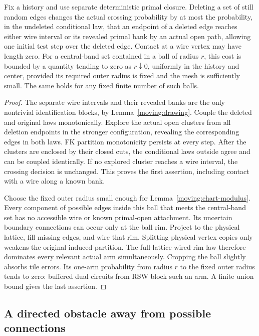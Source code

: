 \begin{lemma}\label{moving:deletion}
Fix a history and use separate deterministic primal closure.
Deleting a set of still random edges changes the actual crossing
probability by at most the probability, in the undeleted conditional
law, that an endpoint of a deleted edge reaches either wire interval
or its revealed primal bank by an actual open path, allowing one
initial test step over the deleted edge.  Contact at a wire vertex
may have length zero.
For a central-band set contained in a ball of radius $r$, this cost
is bounded by a quantity tending to zero as $r\downarrow0$,
uniformly in the history and center, provided its required outer
radius is fixed and the mesh is sufficiently small.  The same holds
for any fixed finite number of such balls.
\end{lemma}
\begin{proof}
The separate wire intervals and their revealed banks are the only
nontrivial identification blocks, by Lemma~\ref{moving:drawing}.
Couple the deleted and original laws monotonically.  Explore the
actual open clusters from all deletion endpoints in the stronger
configuration, revealing the corresponding edges in both laws.
FK partition monotonicity persists at every step.  After the clusters
are enclosed by their closed cuts, the conditional laws outside
agree and can be coupled identically.  If no explored cluster reaches
a wire interval, the crossing decision is unchanged.  This proves
the first assertion, including contact with a wire along a known bank.

Choose the fixed outer radius small enough for
Lemma~\ref{moving:chart-modulus}.  Every component of possible edges
inside this ball that meets the central-band set has no accessible
wire or known primal-open attachment.  Its uncertain boundary
connections can occur only at the ball rim.  Project to the physical
lattice, fill missing edges, and wire that rim.  Splitting physical
vertex copies only weakens the original induced partition.  The
full-lattice wired-rim law therefore dominates every relevant actual
arm simultaneously.  Cropping the ball slightly absorbs tile errors.
Its one-arm probability from radius $r$ to the fixed outer radius
tends to zero: buffered dual circuits from RSW block such an arm.
A finite union bound gives the last assertion.
\end{proof}

\subsection{A directed obstacle away from possible connections}

